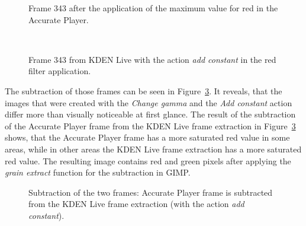 \documentclass[../MasterThesis.tex]{subfiles}
\begin{document}
\begin{minipage}{0.48\textwidth}
	\begin{figure}[H]
		\begin{center}
			\caption[Frame 343 after the application of the red filter in the Accurate Player.]{Frame 343 after the application of the maximum value for red in the Accurate Player.}
			\label{figure:APframe2}
		\end{center}
	\end{figure}
\end{minipage}\begin{minipage}{0.04\textwidth}
	\ 
\end{minipage}\begin{minipage}{0.48\textwidth}
	\begin{figure}[H]
		\begin{center}
			\caption[Frame 343 from KDEN Live with the action \textit{add constant}.]{Frame 343 from KDEN Live with the action \textit{add constant} in the red filter application.}
			\label{figure:addconstant}
		\end{center}
	\end{figure}
\end{minipage}
\vspace*{1em}


The subtraction of those frames can be seen in Figure~\ref{figure:addconstantgimp}. It reveals, that the images that were created with the \textit{Change gamma} and the \textit{Add constant} action differ more than visually noticeable at first glance. The result of the subtraction of the Accurate Player frame from the KDEN Live frame extraction in Figure~\ref{figure:addconstantgimp} shows, that the Accurate Player frame has a more saturated red value in some areas, while in other areas the KDEN Live frame extraction has a more saturated red value. The resulting image contains red and green pixels after applying the \textit{grain extract} function for the subtraction in GIMP.


\begin{figure}[H]
	\begin{center}
		\caption[Subtraction of KDEN Live (\textit{add constant}) and Accurate Player.]{Subtraction of the two frames: Accurate Player frame is subtracted from the KDEN Live frame extraction (with the action \textit{add constant}).}
		\label{figure:addconstantgimp}
	\end{center}
\end{figure}
\end{document}
